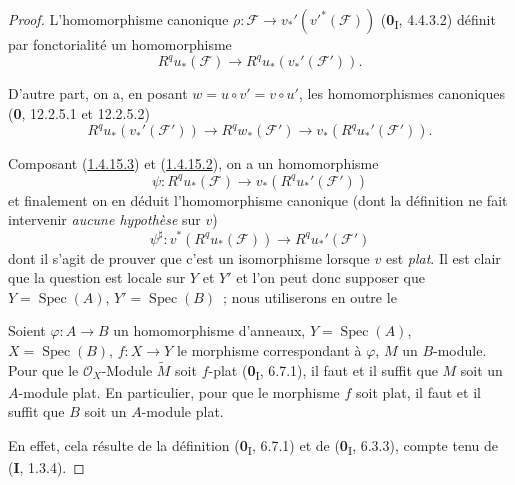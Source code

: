 \begin{proof}
L'homomorphisme canonique
$\rho:\mathcal F\to v_*'(v'^*(\mathcal F))$ (\textbf{0}\textsubscript{I}, 4.4.3.2)
définit par fonctorialité un homomorphisme
\begin{equation}
\label{III.1.4.15.2-fr}
\tag{1.4.15.2}
R^qu_*(\mathcal F)\longrightarrow R^qu_*(v_*'(\mathcal F')).
\end{equation}

D'autre part, on a, en posant $w=u\circ v'=v\circ u'$, les homomorphismes
canoniques (\textbf{0}, 12.2.5.1 et 12.2.5.2)
\begin{equation}
\label{III.1.4.15.3-fr}
\tag{1.4.15.3}
R^qu_*(v_*'(\mathcal F'))\longrightarrow R^qw_*(\mathcal F')
\longrightarrow v_*(R^qu_*'(\mathcal F')).
\end{equation}

Composant (\hyperref[III.1.4.15.3-fr]{1.4.15.3}) et
(\hyperref[III.1.4.15.2-fr]{1.4.15.2}), on a un homomorphisme
\[
\psi:R^qu_*(\mathcal F)\longrightarrow v_*(R^qu_*'(\mathcal F'))
\]
et finalement on en déduit l'homomorphisme canonique (dont la définition ne
fait intervenir \emph{aucune hypothèse} sur $v$)
\begin{equation}
\label{III.1.4.15.4-fr}
\tag{1.4.15.4}
\psi^\sharp:v^*(R^qu_*(\mathcal F))\longrightarrow R^qu_*'(\mathcal F')
\end{equation}
dont il s'agit de prouver que c'est un isomorphisme lorsque $v$ est
\emph{plat}. Il est clair que la question est locale sur $Y$ et $Y'$ et l'on
peut donc supposer que $Y=\operatorname{Spec}(A)$,
$Y'=\operatorname{Spec}(B)$~; nous utiliserons en outre le

\begin{lemma}[1.4.15.5]
\label{III.1.4.15.5-fr}
Soient $\varphi:A\to B$ un homomorphisme d'anneaux,
$Y=\operatorname{Spec}(A)$, $X=\operatorname{Spec}(B)$,
$f:X\to Y$ le morphisme correspondant à $\varphi$, $M$ un $B$-module. Pour
que le $\mathcal O_X$-Module $\widetilde M$ soit $f$-plat
\textup{(\textbf{0}\textsubscript{I}, 6.7.1)}, il faut et il suffit que $M$ soit un $A$-module
plat. En particulier, pour que le morphisme $f$ soit plat, il faut et il
suffit que $B$ soit un $A$-module plat.
\end{lemma}

En effet, cela résulte de la définition (\textbf{0}\textsubscript{I}, 6.7.1) et de
(\textbf{0}\textsubscript{I}, 6.3.3), compte tenu de (\textbf{I}, 1.3.4).


\end{proof}

